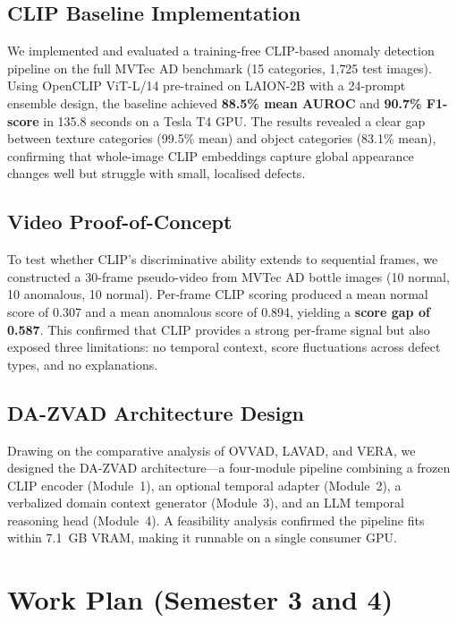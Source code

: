 \subsection{CLIP Baseline Implementation}

We implemented and evaluated a training-free CLIP-based anomaly detection pipeline on the full MVTec AD benchmark (15 categories, 1{,}725 test images). Using OpenCLIP ViT-L/14 pre-trained on LAION-2B with a 24-prompt ensemble design, the baseline achieved \textbf{88.5\% mean AUROC} and \textbf{90.7\% F1-score} in 135.8 seconds on a Tesla T4 GPU. The results revealed a clear gap between texture categories (99.5\% mean) and object categories (83.1\% mean), confirming that whole-image CLIP embeddings capture global appearance changes well but struggle with small, localised defects.

\subsection{Video Proof-of-Concept}

To test whether CLIP's discriminative ability extends to sequential frames, we constructed a 30-frame pseudo-video from MVTec AD bottle images (10 normal, 10 anomalous, 10 normal). Per-frame CLIP scoring produced a mean normal score of 0.307 and a mean anomalous score of 0.894, yielding a \textbf{score gap of 0.587}. This confirmed that CLIP provides a strong per-frame signal but also exposed three limitations: no temporal context, score fluctuations across defect types, and no explanations.

\subsection{DA-ZVAD Architecture Design}

Drawing on the comparative analysis of OVVAD, LAVAD, and VERA, we designed the DA-ZVAD architecture---a four-module pipeline combining a frozen CLIP encoder (Module~1), an optional temporal adapter (Module~2), a verbalized domain context generator (Module~3), and an LLM temporal reasoning head (Module~4). A feasibility analysis confirmed the pipeline fits within 7.1~GB VRAM, making it runnable on a single consumer GPU.


\section{Work Plan (Semester 3 and 4)}
\label{sec:work_plan}

